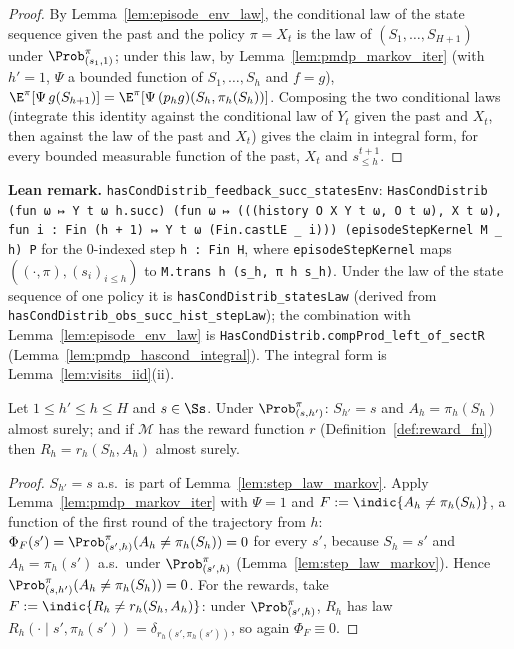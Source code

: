 \begin{proof}
\leanok
By Lemma~\ref{lem:episode_env_law}, the conditional law of the state sequence given the past and
the policy $\pi = X_t$ is the law of $(S_1, \dots, S_{H+1})$ under $\Prob^\pi_{(s_1, 1)}$; under this
law, by Lemma~\ref{lem:pmdp_markov_iter} (with $h' = 1$, $\Psi$ a bounded function of
$S_1, \dots, S_h$ and $f = g$), $\E^\pi[\Psi\, g(S_{h+1})] = \E^\pi[\Psi\,(p_h g)(S_h, \pi_h(S_h))]$.
Composing the two conditional laws (integrate this identity against the conditional law of
$Y_t$ given the past and $X_t$, then against the law of the past and $X_t$) gives the claim in
integral form, for every bounded measurable function of the past, $X_t$ and $s^{t+1}_{\le h}$.
\end{proof}

\textbf{Lean remark.} \texttt{hasCondDistrib\_feedback\_succ\_statesEnv}:
\texttt{HasCondDistrib (fun ω ↦ Y t ω h.succ) (fun ω ↦ (((history O X Y t ω, O t ω), X t ω), fun i : Fin (h + 1) ↦ Y t ω (Fin.castLE \_ i))) (episodeStepKernel M \_ h) P}
for the $0$-indexed step \texttt{h : Fin H}, where \texttt{episodeStepKernel} maps
$((\cdot, \pi), (s_i)_{i \le h})$ to \texttt{M.trans h (s\_h, π h s\_h)}. Under the law of the state
sequence of one policy it is \texttt{hasCondDistrib\_statesLaw} (derived from
\texttt{hasCondDistrib\_obs\_succ\_hist\_stepLaw}); the combination with
Lemma~\ref{lem:episode_env_law} is \texttt{HasCondDistrib.compProd\_left\_of\_sectR}
(Lemma~\ref{lem:pmdp_hascond_integral}). The integral form is Lemma~\ref{lem:visits_iid}(ii).

\begin{lemma}\label{lem:pmdp_action_eq_policy}
\leanok
{}
Let $1 \le h' \le h \le H$ and $s \in \Ss$. Under $\Prob^\pi_{(s,h')}$: $S_{h'} = s$ and
$A_h = \pi_h(S_h)$ almost surely; and if $\mathcal M$ has the reward function $r$
(Definition~\ref{def:reward_fn}) then $R_h = r_h(S_h, A_h)$ almost surely.
\end{lemma}

\begin{proof}
\leanok
$S_{h'} = s$ a.s.\ is part of Lemma~\ref{lem:step_law_markov}. Apply
Lemma~\ref{lem:pmdp_markov_iter} with $\Psi = 1$ and $F := \indic\{A_h \ne \pi_h(S_h)\}$, a
function of the first round of the trajectory from $h$: $\Phi_F(s') = \Prob^\pi_{(s',h)}(A_h \ne \pi_h(S_h)) = 0$
for every $s'$, because $S_h = s'$ and $A_h = \pi_h(s')$ a.s.\ under $\Prob^\pi_{(s',h)}$
(Lemma~\ref{lem:step_law_markov}). Hence $\Prob^\pi_{(s,h')}(A_h \ne \pi_h(S_h)) = 0$. For the
rewards, take $F := \indic\{R_h \ne r_h(S_h, A_h)\}$: under $\Prob^\pi_{(s',h)}$, $R_h$ has law
$R_h(\cdot \mid s', \pi_h(s')) = \delta_{r_h(s', \pi_h(s'))}$, so again $\Phi_F \equiv 0$.
\end{proof}

